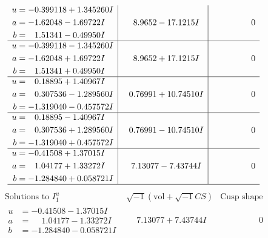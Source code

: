 \documentclass[1p]{elsarticle_modified}
\theoremstyle{definition}
\newcommand{\I}{\sqrt{-1}}
\begin{document}
$$\begin{array}{c|c|c}
\begin{aligned}
u &= -0.399118 + 1.345260 I \\
a &= -1.62048 - 1.69722 I \\
b &= \phantom{-}1.51341 - 0.49950 I\end{aligned}
 & \phantom{-}8.9652 - 17.1215 I & \phantom{-0.000000 } 0 \\ \hline\begin{aligned}
u &= -0.399118 - 1.345260 I \\
a &= -1.62048 + 1.69722 I \\
b &= \phantom{-}1.51341 + 0.49950 I\end{aligned}
 & \phantom{-}8.9652 + 17.1215 I & \phantom{-0.000000 } 0 \\ \hline\begin{aligned}
u &= \phantom{-}0.18895 + 1.40967 I \\
a &= \phantom{-}0.307536 - 1.289560 I \\
b &= -1.319040 - 0.457572 I\end{aligned}
 & \phantom{-}0.76991 + 10.74510 I & \phantom{-0.000000 } 0 \\ \hline\begin{aligned}
u &= \phantom{-}0.18895 - 1.40967 I \\
a &= \phantom{-}0.307536 + 1.289560 I \\
b &= -1.319040 + 0.457572 I\end{aligned}
 & \phantom{-}0.76991 - 10.74510 I & \phantom{-0.000000 } 0 \\ \hline\begin{aligned}
u &= -0.41508 + 1.37015 I \\
a &= \phantom{-}1.04177 + 1.33272 I \\
b &= -1.284840 + 0.058721 I\end{aligned}
 & \phantom{-}7.13077 - 7.43744 I & \phantom{-0.000000 } 0\\
 \hline 
 \end{array}$$\newpage$$\begin{array}{c|c|c}  
\text{Solutions to }I^u_{1}& \I (\text{vol} + \sqrt{-1}CS) & \text{Cusp shape}\\
 \hline 
\begin{aligned}
u &= -0.41508 - 1.37015 I \\
a &= \phantom{-}1.04177 - 1.33272 I \\
b &= -1.284840 - 0.058721 I\end{aligned}
 & \phantom{-}7.13077 + 7.43744 I & \phantom{-0.000000 } 0 \\ \hline\begin{aligned}

\end{aligned}
\end{array}$$
\end{document}
